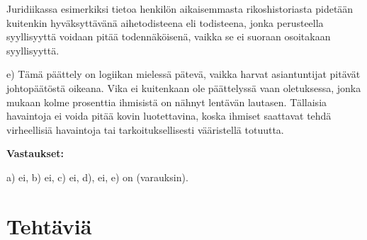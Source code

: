 Juridiikassa esimerkiksi tietoa henkilön aikaisemmasta rikoshistoriasta pidetään kuitenkin hyväksyttävänä aihetodisteena eli todisteena, jonka perusteella syyllisyyttä voidaan pitää todennäköisenä, vaikka se ei suoraan osoitakaan syyllisyyttä.

e) Tämä päättely on logiikan mielessä pätevä, vaikka harvat asiantuntijat pitävät johtopäätöstä oikeana. Vika ei kuitenkaan ole päättelyssä vaan oletuksessa, jonka mukaan kolme prosenttia ihmisistä on nähnyt lentävän lautasen. Tällaisia havaintoja ei voida pitää kovin luotettavina, koska ihmiset saattavat tehdä virheellisiä havaintoja tai tarkoituksellisesti vääristellä totuutta.

{\bf Vastaukset:}

a) ei, b) ei, c) ei, d), ei, e) on (varauksin).

\newpage
 
\section*{Tehtäviä}


